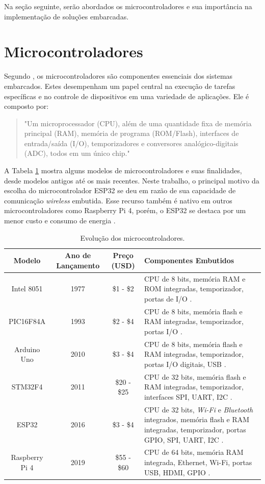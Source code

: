 Na seção seguinte, serão abordados os microcontroladores e sua importância na implementação de soluções embarcadas.

\section{Microcontroladores}

Segundo \textcite{lee2008cyber}, os microcontroladores são componentes essenciais dos sistemas embarcados. Estes desempenham um papel central na execução de tarefas específicas e no controle de dispositivos em uma variedade de aplicações. Ele é composto por:

\begin{quote}
  "Um microprocessador (CPU), além de uma quantidade fixa de memória principal (RAM), memória de programa (ROM/Flash),  interfaces de entrada/saída (I/O), temporizadores e conversores analógico-digitais (ADC), todos em um único chip." \parencite[{p. 40}]{Mazid_microcontrolador2011}
\end{quote}

A Tabela \ref{tab:evolucao_microcontroladores} mostra alguns modelos de microcontroladores e suas finalidades, desde modelos antigos até os mais recentes. Neste trabalho, o principal motivo da escolha do microcontrolador ESP32 se deu em razão de sua capacidade de comunicação \textit{wireless} embutida. Esse recurso também é nativo em outros microcontroladores como Raspberry Pi 4, porém, o ESP32 se destaca por um menor custo e consumo de energia \parencite{ESP32_usage}.

\begin{table}[!htb]
\caption{Evolução dos microcontroladores.} \label{tab:evolucao_microcontroladores}
\begin{tabularx}{\textwidth}{|c|c|c|X|} \hline
\textbf{Modelo} & \textbf{Ano de Lançamento} & \textbf{Preço (USD)} & \textbf{Componentes Embutidos} \\ \hline
Intel 8051 & 1977 & \$1 - \$2 & CPU de 8 bits, memória RAM e ROM integradas, temporizador, portas de I/O \parencite{8051_usage}. \\ \hline
PIC16F84A & 1993 & \$2 - \$4 & CPU de 8 bits, memória flash e RAM integradas, temporizador, portas I/O \parencite{PIC16F84A_usage}. \\ \hline
Arduino Uno & 2010 & \$3 - \$4 & CPU de 8 bits, memória flash e RAM integradas, temporizador, portas I/O digitais, USB \parencite{Arduino_usage}. \\ \hline
STM32F4 & 2011 & \$20 - \$25 & CPU de 32 bits, memória flash e RAM integradas, temporizador, interfaces SPI, UART, I2C \parencite{STM32F4_usage}. \\ \hline
ESP32 & 2016 & \$3 - \$4 & CPU de 32 bits, \textit{Wi-Fi} e \textit{Bluetooth} integrados, memória flash e RAM integradas, temporizador, portas GPIO, SPI, UART, I2C \parencite{ESP32_usage}. \\ \hline
Raspberry Pi 4 & 2019 & \$55 - \$60 & CPU de 64 bits, memória RAM integrada, Ethernet, Wi-Fi, portas USB, HDMI, GPIO \parencite{RaspberryPi4_usage}. \\ \hline
\end{tabularx}
\end{table}


